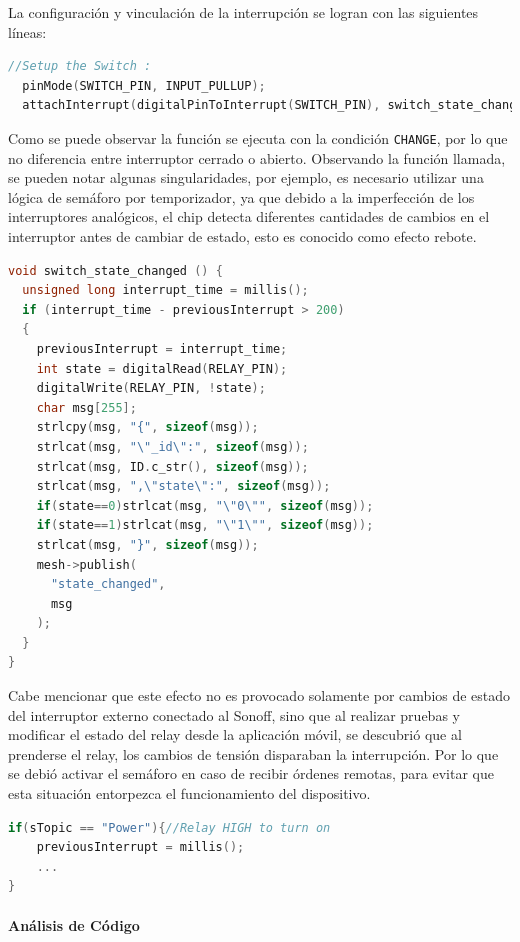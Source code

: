 La configuración y vinculación de la interrupción se logran con las siguientes líneas:

\begin{lstlisting}[language=C]
  //Setup the Switch :
  pinMode(SWITCH_PIN, INPUT_PULLUP);
  attachInterrupt(digitalPinToInterrupt(SWITCH_PIN), switch_state_changed, CHANGE);
\end{lstlisting}

Como se puede observar la función se ejecuta con la condición \lstinline[columns=fixed]{CHANGE}, por lo que no diferencia entre interruptor cerrado o abierto.
Observando la función llamada, se pueden notar algunas singularidades, por ejemplo, es necesario utilizar una lógica de semáforo por temporizador, ya que debido a la imperfección de los interruptores analógicos, el chip detecta diferentes cantidades de cambios en el interruptor antes de cambiar de estado, esto es conocido como efecto rebote.

\begin{lstlisting}[language=C]
void switch_state_changed () {
  unsigned long interrupt_time = millis();
  if (interrupt_time - previousInterrupt > 200)
  {
    previousInterrupt = interrupt_time;
    int state = digitalRead(RELAY_PIN);
    digitalWrite(RELAY_PIN, !state);
    char msg[255];
    strlcpy(msg, "{", sizeof(msg));
    strlcat(msg, "\"_id\":", sizeof(msg));
    strlcat(msg, ID.c_str(), sizeof(msg));
    strlcat(msg, ",\"state\":", sizeof(msg));
    if(state==0)strlcat(msg, "\"0\"", sizeof(msg));
    if(state==1)strlcat(msg, "\"1\"", sizeof(msg));
    strlcat(msg, "}", sizeof(msg));
    mesh->publish(
      "state_changed",
      msg
    );
  }
}
\end{lstlisting}


Cabe mencionar que este efecto no es provocado solamente por cambios de estado del interruptor externo conectado al Sonoff, sino que al realizar pruebas y modificar el estado del relay desde la aplicación móvil, se descubrió que al prenderse el relay, los cambios de tensión disparaban la interrupción. Por lo que se debió activar el semáforo en caso de recibir órdenes remotas, para evitar que esta situación entorpezca el funcionamiento del dispositivo.

\begin{lstlisting}[language=C]
if(sTopic == "Power"){//Relay HIGH to turn on
    previousInterrupt = millis();
    ...
}
\end{lstlisting}


\paragraph{Análisis de Código}

